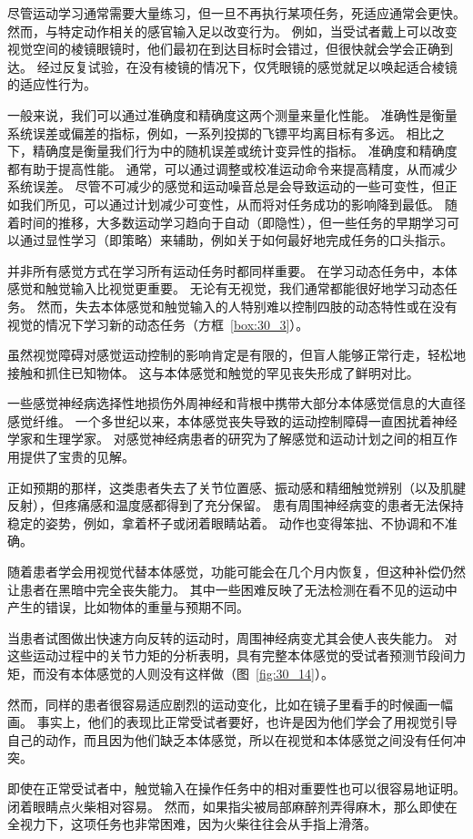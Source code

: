 尽管运动学习通常需要大量练习，但一旦不再执行某项任务，死适应通常会更快。
然而，与特定动作相关的感官输入足以改变行为。
例如，当受试者戴上可以改变视觉空间的棱镜眼镜时，他们最初在到达目标时会错过，但很快就会学会正确到达。
经过反复试验，在没有棱镜的情况下，仅凭眼镜的感觉就足以唤起适合棱镜的适应性行为。


一般来说，我们可以通过准确度和精确度这两个测量来量化性能。
准确性是衡量系统误差或偏差的指标，例如，一系列投掷的飞镖平均离目标有多远。
相比之下，精确度是衡量我们行为中的随机误差或统计变异性的指标。
准确度和精确度都有助于提高性能。
通常，可以通过调整或校准运动命令来提高精度，从而减少系统误差。
尽管不可减少的感觉和运动噪音总是会导致运动的一些可变性，但正如我们所见，可以通过计划减少可变性，从而将对任务成功的影响降到最低。
随着时间的推移，大多数运动学习趋向于自动（即隐性），但一些任务的早期学习可以通过显性学习（即策略）来辅助，例如关于如何最好地完成任务的口头指示。


并非所有感觉方式在学习所有运动任务时都同样重要。
在学习动态任务中，本体感觉和触觉输入比视觉更重要。 无论有无视觉，我们通常都能很好地学习动态任务。
然而，失去本体感觉和触觉输入的人特别难以控制四肢的动态特性或在没有视觉的情况下学习新的动态任务（方框~\ref{box:30_3}）。


\begin{proposition}[本体感觉和触觉对感觉运动控制至关重要] \label{box:30_3}
	
	\quad \quad 虽然视觉障碍对感觉运动控制的影响肯定是有限的，但盲人能够正常行走，轻松地接触和抓住已知物体。
	这与本体感觉和触觉的罕见丧失形成了鲜明对比。
	
	\quad \quad 一些感觉神经病选择性地损伤外周神经和背根中携带大部分本体感觉信息的大直径感觉纤维。
	一个多世纪以来，本体感觉丧失导致的运动控制障碍一直困扰着神经学家和生理学家。
	对感觉神经病患者的研究为了解感觉和运动计划之间的相互作用提供了宝贵的见解。
	
	\quad \quad 正如预期的那样，这类患者失去了关节位置感、振动感和精细触觉辨别（以及肌腱反射），但疼痛感和温度感都得到了充分保留。
	患有周围神经病变的患者无法保持稳定的姿势，例如，拿着杯子或闭着眼睛站着。
	动作也变得笨拙、不协调和不准确。
	
	\quad \quad 随着患者学会用视觉代替本体感觉，功能可能会在几个月内恢复，但这种补偿仍然让患者在黑暗中完全丧失能力。
	其中一些困难反映了无法检测在看不见的运动中产生的错误，比如物体的重量与预期不同。
	
	\quad \quad 当患者试图做出快速方向反转的运动时，周围神经病变尤其会使人丧失能力。
	对这些运动过程中的关节力矩的分析表明，具有完整本体感觉的受试者预测节段间力矩，而没有本体感觉的人则没有这样做（图~\ref{fig:30_14}）。
	
	\quad \quad 然而，同样的患者很容易适应剧烈的运动变化，比如在镜子里看手的时候画一幅画。
	事实上，他们的表现比正常受试者要好，也许是因为他们学会了用视觉引导自己的动作，而且因为他们缺乏本体感觉，所以在视觉和本体感觉之间没有任何冲突。
	
	\quad \quad 即使在正常受试者中，触觉输入在操作任务中的相对重要性也可以很容易地证明。
	闭着眼睛点火柴相对容易。
	然而，如果指尖被局部麻醉剂弄得麻木，那么即使在全视力下，这项任务也非常困难，因为火柴往往会从手指上滑落。
	
\end{proposition}



